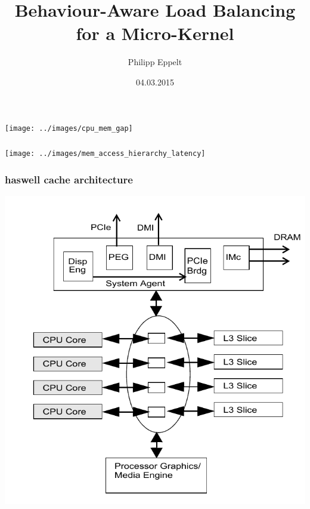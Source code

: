 \documentclass[utf8,10pt]{beamer}
\title[]{Behaviour-Aware Load Balancing for a Micro-Kernel}
\author{Philipp Eppelt}
\date{04.03.2015}
\begin{document}
\maketitle

\large

\newcommand{\ft}[1]{\frametitle{\hfill #1}}


\begin{frame}
  \frametitle{}
  \centering
  \texttt{[image: ../images/cpu\_mem\_gap]}
\end{frame}


\begin{frame}
  \frametitle{}
  \centering
  \texttt{[image: ../images/mem\_access\_hierarchy\_latency]}
\end{frame}


\begin{frame}
  \frametitle{haswell cache architecture}
  \centering
  \begin{minipage}[l]{.49\columnwidth}
    
  \end{minipage}
  \begin{minipage}[r]{.49\columnwidth}
    \includegraphics[scale=.27]{../images/haswell_architecture_by_intel_large_cropped}
  \end{minipage}
\end{frame}
\end{document}
